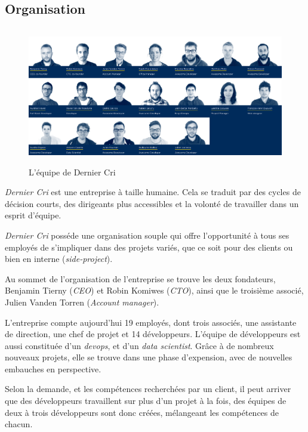 \documentclass[12pt,a4paper]{article}
\begin{document}
  \bigskip

  \subsection{Organisation}\label{organisation}

  \begin{figure}[h]
    \centering
    \includegraphics[height=6cm]{figures/team.png}
    \caption{L'équipe de Dernier Cri}
  \end{figure}

  \bigskip

  \emph{Dernier Cri} est une entreprise à taille humaine. Cela se traduit
  par des cycles de décision courts, des dirigeants plus accessibles et la
  volonté de travailler dans un esprit d'équipe.

  \bigskip

  \emph{Dernier Cri} posséde une organisation souple qui offre
  l'opportunité à tous ses employés de s'impliquer dans des projets
  variés, que ce soit pour des clients ou bien en interne
  (\emph{side-project}).

  \bigskip

  Au sommet de l'organisation de l'entreprise se trouve les deux
  fondateurs, Benjamin Tierny (\emph{CEO}) et Robin Komiwes (\emph{CTO}),
  ainsi que le troisième associé, Julien Vanden Torren (\emph{Account
  manager}).

  \bigskip

  L'entreprise compte aujourd'hui 19 employés, dont trois associés, une
  assistante de direction, une chef de projet et 14 développeurs. L'équipe
  de développeurs est aussi constituée d'un \emph{devops}, et d'un
  \emph{data scientist}. Grâce à de nombreux nouveaux projets, elle se
  trouve dans une phase d'expension, avec de nouvelles embauches en
  perspective.

  \bigskip

  Selon la demande, et les compétences recherchées par un client, il peut
  arriver que des développeurs travaillent sur plus d'un projet à la fois,
  des équipes de deux à trois développeurs sont donc créées, mélangeant
  les compétences de chacun.
\end{document}
